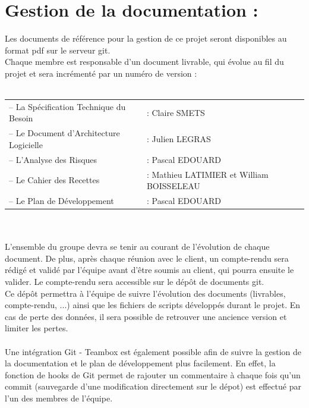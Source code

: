 \documentclass[a4paper,11pt,french]{article}
\begin{document}
\section{Gestion de la documentation :}
Les documents de référence pour la gestion de ce projet seront disponibles au format pdf sur le serveur git. \\

Chaque membre est responsable d'un document livrable, qui évolue au fil du projet et sera incrémenté par un numéro de version :\\ \\
\begin{tabular}{ll}
–	La Spécification Technique du Besoin 	& : Claire SMETS\\
–	Le Document d'Architecture Logicielle 	& : Julien LEGRAS\\
–	L'Analyse des Risques 					& : Pascal EDOUARD\\
–	Le Cahier des Recettes 					& : Mathieu LATIMIER et William BOISSELEAU\\
–	Le Plan de Développement 				& : Pascal EDOUARD\\
\end{tabular}
\\ \\

L'ensemble du groupe devra se tenir au courant de l'évolution de chaque document. De plus, après chaque réunion avec le client, un compte-rendu sera rédigé et validé par l'équipe avant d'être soumis au client, qui pourra ensuite le valider. Le compte-rendu sera accessible sur le dépôt de documents git.
\\
Ce dépôt permettra à l'équipe de suivre l'évolution des documents (livrables, compte-rendu, ...) ainsi que les fichiers de scripts développés durant le projet. En cas de perte des données, il sera possible de retrouver une ancience version et limiter les pertes.
\\ \\
Une intégration Git - Teambox est également possible afin de suivre la gestion de la documentation et le plan de développement plus facilement. En effet, la fonction de hooks de Git permet de rajouter un commentaire à chaque fois qu'un commit (sauvegarde d'une modification directement sur le dépot) est effectué par l'un des membres de l'équipe.
\end{document}
